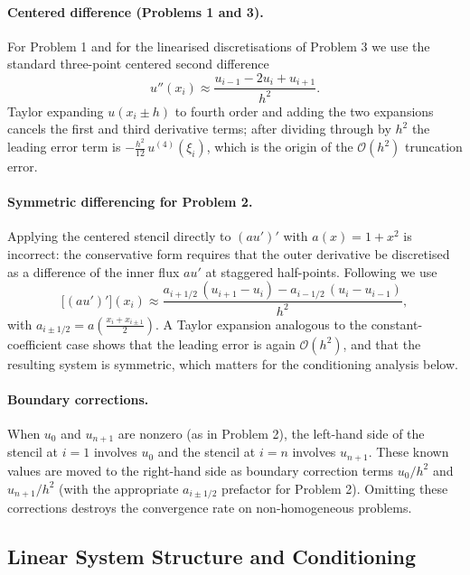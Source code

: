 \documentclass[11pt]{article}
\theoremstyle{plain}
\theoremstyle{remark}
\newcommand{\bigO}{\mathcal{O}}
\begin{document}
\paragraph{Centered difference (Problems 1 and 3).} For Problem 1 and for
the linearised discretisations of Problem 3 we use the standard
three-point centered second difference
\begin{equation}
u''(x_i) \approx \frac{u_{i-1} - 2 u_i + u_{i+1}}{h^2}.
\label{eq:centered}
\end{equation}
Taylor expanding $u(x_i \pm h)$ to fourth order and adding the two
expansions cancels the first and third derivative terms; after dividing
through by $h^2$ the leading error term is
$-\tfrac{h^2}{12}\,u^{(4)}(\xi_i)$, which is the origin of the
$\bigO(h^2)$ truncation error.

\paragraph{Symmetric differencing for Problem 2.} Applying the centered
stencil directly to $(a u')'$ with $a(x) = 1 + x^2$ is incorrect: the
conservative form requires that the outer derivative be discretised as a
difference of the inner flux $a u'$ at staggered half-points. Following
\citep{khouider2026bvp} we use
\begin{equation}
\bigl[(a u')'\bigr](x_i) \approx \frac{a_{i+1/2}\,(u_{i+1} - u_i)
  - a_{i-1/2}\,(u_i - u_{i-1})}{h^2},
\label{eq:symmetric}
\end{equation}
with $a_{i\pm 1/2} = a\!\left(\tfrac{x_i + x_{i\pm 1}}{2}\right)$. A Taylor
expansion analogous to the constant-coefficient case shows that the leading
error is again $\bigO(h^2)$, and that the resulting system is symmetric,
which matters for the conditioning analysis below.

\paragraph{Boundary corrections.} When $u_0$ and $u_{n+1}$ are nonzero (as
in Problem 2), the left-hand side of the stencil at $i=1$ involves $u_0$ and
the stencil at $i=n$ involves $u_{n+1}$. These known values are moved to the
right-hand side as boundary correction terms $u_0/h^2$ and
$u_{n+1}/h^2$ (with the appropriate $a_{i\pm 1/2}$ prefactor for Problem 2).
Omitting these corrections destroys the convergence rate on non-homogeneous
problems.


\subsection{Linear System Structure and Conditioning}
\label{sec:linsys}
\end{document}
